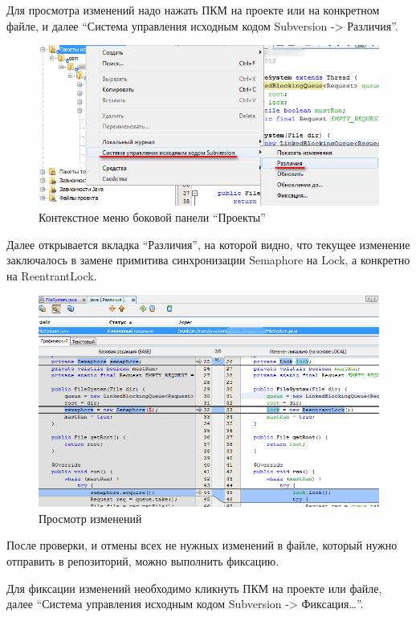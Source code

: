 \documentclass[a4paper,12pt]{article}
\begin{document}
Для просмотра изменений надо нажать ПКМ на проекте или на конкретном
файле, и далее ``Система управления исходным кодом Subversion
-\textgreater{} Различия''. 

\begin{figure}[h!]
	\centering
	\includegraphics[scale=0.90]{netbeans-diff-1.png}
	\caption{Контекстное меню боковой панели ``Проекты''}
\end{figure}

Далее открывается вкладка ``Различия'', на которой видно, что текущее
изменение заключалось в замене примитива синхронизации Semaphore на
Lock, а конкретно на ReentrantLock.

\begin{figure}[h!]
	\centering
	\includegraphics[scale=0.80]{netbeans-diff-2.png}
	\caption{Просмотр изменений}
\end{figure}

После проверки, и отмены всех не нужных изменений в файле, который нужно
отправить в репозиторий, можно выполнить фиксацию.

Для фиксации изменений необходимо кликнуть ПКМ на проекте или файле,
далее ``Система управления исходным кодом Subversion -\textgreater{}
Фиксация\ldots{}''.
\end{document}
